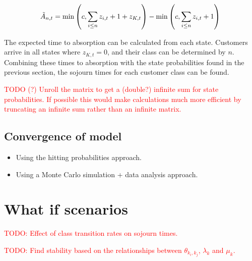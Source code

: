 \documentclass{article}
\begin{document}
\begin{equation}\label{eqn:inservice_adapt_tilde}
\tilde{A}_{n,t} =
\min\left(c, \sum_{i \leq n} z_{i,t} + 1 + z_{K,t}\right) - \min\left(c, \sum_{i \leq n} z_{i,t} + 1\right) \\
\end{equation}


The expected time to absorption can be calculated from each state.
Customers arrive in all states where $z_{K,t} = 0$, and their class can be
determined by $n$. Combining these times to absorption with the state
probabilities found in the previous section, the sojourn times for each customer
class can be found.

\textcolor{red}{TODO (?) Unroll the matrix to get a (double?) infinite sum for state probabilities. If possible this would make calculations much more efficient by truncating an infinite sum rather than an infinite matrix.}

\subsection{Convergence of model}

\begin{itemize}
        \item Using the hitting probabilities approach.
        \item Using a Monte Carlo simulation + data analysis approach.
\end{itemize}

\section{What if scenarios}

\textcolor{red}{TODO: Effect of class transition rates on sojourn times.}

\textcolor{red}{TODO: Find stability based on the relationships between $\theta_{k_i,k_j}$, $\lambda_k$ and $\mu_k$.}



\end{document}
